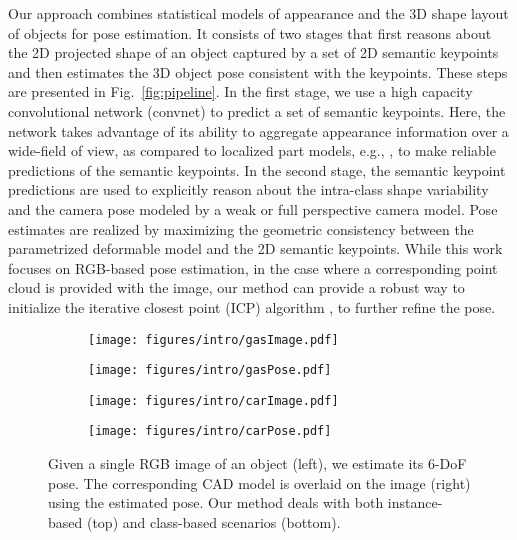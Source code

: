 \documentclass[letterpaper, 10 pt, conference]{ieeeconf}
\begin{document}
Our approach combines statistical models of appearance and the 3D shape layout of objects for pose estimation. It consists of two stages that first reasons about the 2D projected shape of an object captured by a set of 2D semantic keypoints and then estimates the 3D object pose consistent with the  keypoints. These steps are presented in Fig.~\ref{fig:pipeline}. In the first stage, we use a high capacity convolutional network (convnet) to predict a set of semantic keypoints. Here, the network takes advantage of its ability to aggregate appearance information over a wide-field of view, as compared to localized part models, e.g., \cite{gu2010}, to make reliable predictions of the semantic keypoints.  In the second stage, the semantic keypoint predictions are used to explicitly reason about the intra-class shape variability and the camera pose modeled by a weak or full perspective camera model. Pose estimates are realized by maximizing the geometric consistency between the parametrized deformable model and the 2D semantic keypoints. While this work focuses on RGB-based pose estimation, in the case where a corresponding point cloud is provided with the image, our method can provide a robust way to initialize the iterative closest point (ICP) algorithm \cite{ICP}, to further refine the pose.

\begin{figure}
  \centering
  \begin{subfigure}[b]{0.2\textwidth}
    \texttt{[image: figures/intro/gasImage.pdf]}
  \end{subfigure}
  \begin{subfigure}[b]{0.2\textwidth}
  \texttt{[image: figures/intro/gasPose.pdf]}
  \end{subfigure}  
  \begin{subfigure}[b]{0.2\textwidth}
  \texttt{[image: figures/intro/carImage.pdf]}
  \end{subfigure}
  \begin{subfigure}[b]{0.2\textwidth}
  \texttt{[image: figures/intro/carPose.pdf]}
 \end{subfigure}  
  \caption{Given a single RGB image of an object (left), we estimate its 6-DoF pose. 
The corresponding CAD model is overlaid on the image (right) using the estimated pose. 
Our method
deals with both instance-based (top) and class-based scenarios (bottom).
}\label{fig:intro}
\vspace{-2em}
\end{figure}
\end{document}

